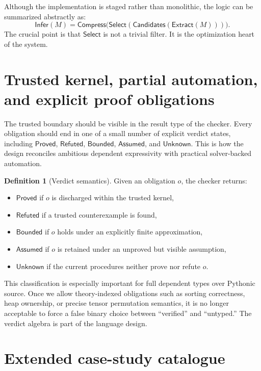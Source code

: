 \documentclass[11pt]{article}
\newcommand{\Proved}{\ensuremath{\mathsf{Proved}}}
\newcommand{\Refuted}{\ensuremath{\mathsf{Refuted}}}
\newcommand{\Unknown}{\ensuremath{\mathsf{Unknown}}}
\newcommand{\Assumed}{\ensuremath{\mathsf{Assumed}}}
\newcommand{\Bounded}{\ensuremath{\mathsf{Bounded}}}
\theoremstyle{definition}
\newtheorem{definition}{Definition}[section]
\theoremstyle{plain}
\begin{document}
Although the implementation is staged rather than monolithic, the logic can be
summarized abstractly as:
\[
\mathsf{Infer}(M) = \mathsf{Compress}\big(
  \mathsf{Select}(\mathsf{Candidates}(\mathsf{Extract}(M)))
\big).
\]
The crucial point is that \(\mathsf{Select}\) is not a trivial filter. It is the
optimization heart of the system.



\section{Trusted kernel, partial automation, and explicit proof obligations}

The trusted boundary should be visible in the result type of the checker. Every
obligation should end in one of a small number of explicit verdict states,
including \Proved{}, \Refuted{}, \Bounded{}, \Assumed{}, and \Unknown{}. This is
how the design reconciles ambitious dependent expressivity with practical
solver-backed automation.

\begin{definition}[Verdict semantics]
Given an obligation $o$, the checker returns:
\begin{itemize}
  \item \Proved{} if $o$ is discharged within the trusted kernel,
  \item \Refuted{} if a trusted counterexample is found,
  \item \Bounded{} if $o$ holds under an explicitly finite approximation,
  \item \Assumed{} if $o$ is retained under an unproved but visible assumption,
  \item \Unknown{} if the current procedures neither prove nor refute $o$.
\end{itemize}
\end{definition}

This classification is especially important for full dependent types over
Pythonic source. Once we allow theory-indexed obligations such as sorting
correctness, heap ownership, or precise tensor permutation semantics, it is no
longer acceptable to force a false binary choice between ``verified'' and
``untyped.'' The verdict algebra is part of the language design.


\section{Extended case-study catalogue}
\end{document}
